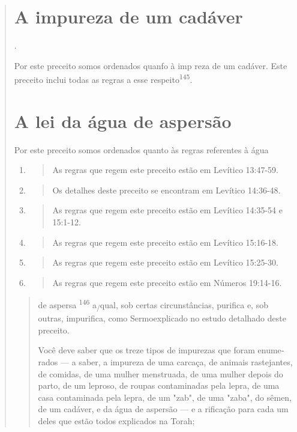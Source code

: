 \begin{quote}
\section{A impureza de um cadáver}
.

Por este preceito somos ordenados quanfo à imp reza de um cadá­ver. Este
preceito inclui todas as regras a esse respeito\textsuperscript{145}.

\section{A lei da água de aspersão}

Por este preceito somos ordenados quanto às regras referentes à água

\begin{enumerate}
\def\labelenumi{\arabic{enumi}.}
\setcounter{enumi}{139}
\item
 \begin{quote}
 As regras que regem este preceito estão em Levítico 13:47-59.
 \end{quote}
\item
 \begin{quote}
 Os detalhes deste preceito se encontram em Levítico 14:36-48.
 \end{quote}
\item
 \begin{quote}
 As regras que regem este preceito estão em Levítico 14:35-54 e
 15:1-12.
 \end{quote}
\item
 \begin{quote}
 As regras que regem este preceito estão em Levítico 15:16-18.
 \end{quote}
\item
 \begin{quote}
 As regras que regem este preceito estão em Levítico 15:25-30.
 \end{quote}
\item
 \begin{quote}
 As regras que regem este preceito estão em Números 19:14-16.
 \end{quote}
\end{enumerate}

\begin{quote}de aspersa \textsuperscript{146} a\textsubscript{/}qual, sob certas
circunstâncias, purifica e, sob outras, impuri­fica, como Sermoexplicado
no estudo detalhado deste preceito.

Você deve saber que os treze tipos de impurezas que foram enume­rados
--- a saber, a impureza de uma carcaça, de animais rastejantes, de
comi­das, de uma mulher menstruada, de uma mulher depois do parto, de um
lepro­so, de roupas contaminadas pela lepra, de uma casa contaminada
pela lepra, de um "zab", de uma "zaba", do sêmen, de um cadáver, e da
água de aspersão --- e a rificação para cada um deles que estão todos
explicados na Torah;


\end{quote}
\end{quote}
